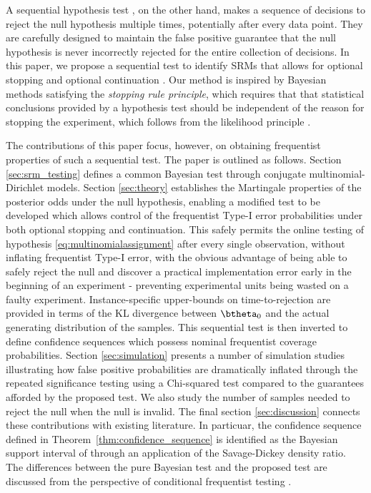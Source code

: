 \documentclass[11pt]{article}
\begin{document}
A sequential hypothesis test \citep{todo}, on the other hand, makes a sequence of decisions to reject the null hypothesis multiple times, potentially after every data point. They are carefully designed to maintain the false positive guarantee that the null hypothesis is never incorrectly rejected for the entire collection of decisions.
In this paper, we propose a sequential test to identify SRMs that allows for optional stopping and optional continuation .
Our method is inspired by Bayesian methods satisfying the \textit{stopping rule principle}, which requires that that statistical conclusions provided by a hypothesis test should be independent of the reason for stopping the experiment, which follows from the likelihood principle \citep{likelihood}.

The contributions of this paper focus, however, on obtaining frequentist properties of such a sequential test.
The paper is outlined as follows.
Section \ref{sec:srm_testing} defines a common Bayesian test through conjugate multinomial-Dirichlet models.
Section \ref{sec:theory} establishes the Martingale properties of the posterior odds under the null hypothesis, enabling a modified test to be developed which allows control of the frequentist Type-I error probabilities under both optional stopping and continuation.
This safely permits the online testing of hypothesis \eqref{eq:multinomialassignment} after every single observation, without inflating frequentist Type-I error, with the obvious advantage of being able to safely reject the null and discover a practical implementation error early in the beginning of an experiment - preventing experimental units being wasted on a faulty experiment.
Instance-specific upper-bounds on time-to-rejection are provided in terms of the KL divergence  between $\btheta_0$ and the actual generating distribution of the samples.
This sequential test is then inverted to define confidence sequences which possess nominal frequentist coverage probabilities.
Section \ref{sec:simulation} presents a number of simulation studies illustrating how false positive probabilities are dramatically inflated through the repeated significance testing using a Chi-squared test compared to the guarantees afforded by the proposed test.
We also study the number of samples needed to reject the null when the null is invalid.
The final section \ref{sec:discussion} connects these contributions with existing literature.
In particuar, the confidence sequence defined in Theorem~\ref{thm:confidence_sequence} is identified as the Bayesian support interval of \cite{support_interval} through an application of the Savage-Dickey density ratio.
The differences between the pure Bayesian test and the proposed test are discussed from the perspective of conditional frequentist testing \citep{conditional_frequentist_simple, conditional_frequentist_precise, conditional_frequentist_composite}.
\end{document}
